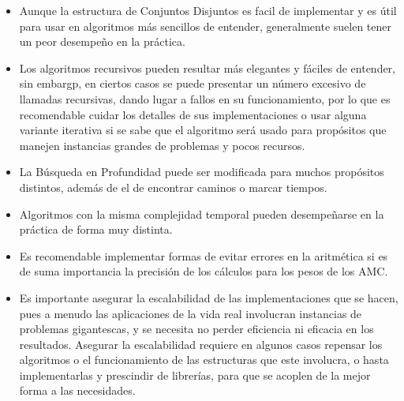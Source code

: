 \documentclass[11pt]{article}
\begin{document}
\begin{itemize}
   \item Aunque la estructura de Conjuntos Disjuntos es facil de implementar y es útil 
   para usar en algoritmos más sencillos de entender, generalmente suelen tener un peor 
   desempeño en la práctica.
   \item Los algoritmos recursivos pueden resultar más elegantes y fáciles de entender,
   sin embargp, en ciertos casos se puede presentar un número excesivo de llamadas recursivas,
   dando lugar a fallos en su funcionamiento, por lo que es recomendable cuidar los detalles
   de sus implementaciones o usar alguna variante iterativa si se sabe que el algoritmo
   será usado para propósitos que manejen instancias grandes de problemas y pocos recursos.
   \item La Búsqueda en Profundidad puede ser modificada para muchos propósitos distintos, además
   de el de encontrar caminos o marcar tiempos. 
   \item Algoritmos con la misma complejidad temporal pueden desempeñarse en la práctica 
   de forma muy distinta.
   \item Es recomendable implementar formas de evitar errores en la aritmética si es de suma
   importancia la precisión de los cálculos para los pesos de los AMC.
   \item Es importante asegurar la escalabilidad de las implementaciones que se hacen, pues a
   menudo las aplicaciones de la vida real involucran instancias de problemas gigantescas, y
   se necesita no perder eficiencia ni eficacia en los resultados. Asegurar la escalabilidad 
   requiere en algunos casos repensar los algoritmos o el funcionamiento de las estructuras que 
   este involucra, o hasta implementarlas y prescindir de librerías, para que se acoplen de la 
   mejor forma a las necesidades.
\end{itemize}
\end{document}

